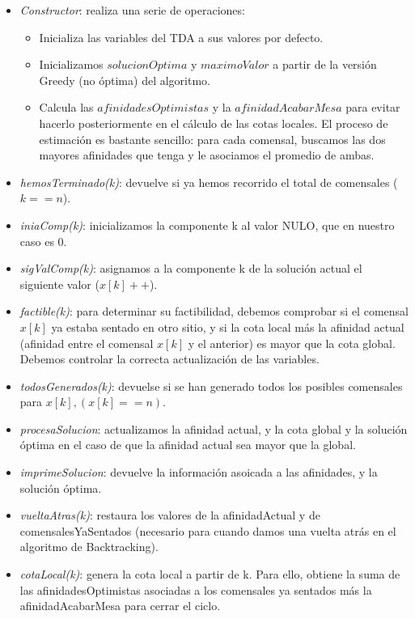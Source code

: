\documentclass{article}
\begin{document}
\begin{itemize}
\begin{itemize}
			\item \textit {Constructor}: realiza una serie de operaciones:
			\begin{itemize}
				\item Inicializa las variables del TDA a sus valores por defecto.
				\item Inicializamos $solucionOptima$ y $maximoValor$ a partir de la versión Greedy (no óptima) del algoritmo.
				\item Calcula las $afinidadesOptimistas$ y la $afinidadAcabarMesa$ para evitar hacerlo posteriormente en el cálculo de las cotas locales. El proceso de estimación es bastante sencillo: para cada comensal, buscamos las dos mayores afinidades que tenga y le asociamos el promedio de ambas.
			\end{itemize}
			\item \textit {hemosTerminado(k)}: devuelve si ya hemos recorrido el total de comensales ($k==n$).
			\item \textit {iniaComp(k)}: inicializamos la componente k al valor NULO, que en nuestro caso es 0.
			\item \textit{sigValComp(k)}: asignamos a la componente k de la solución actual el siguiente valor ($x[k]++$).
			\item \textit{factible(k)}: para determinar su factibilidad, debemos comprobar si el comensal $x[k]$ ya estaba sentado en otro sitio, y si la cota local más la afinidad actual (afinidad entre el comensal $x[k]$ y el anterior) es mayor que la cota global. Debemos controlar la correcta actualización de las variables. 
			\item \textit{todosGenerados(k)}: devuelse si se han generado todos los posibles comensales para $x[k], (x[k]==n)$. 
			\item \textit{procesaSolucion}: actualizamos la afinidad actual, y la cota global y la solución óptima en el caso de que la afinidad actual sea mayor que la global.
			\item \textit{imprimeSolucion}: devuelve la información asoicada a las afinidades, y la solución óptima. 
			\item \textit{vueltaAtras(k)}: restaura los valores de la afinidadActual y de comensalesYaSentados (necesario para cuando damos una vuelta atrás en el algoritmo de Backtracking).
			\item \textit{cotaLocal(k)}: genera la cota local a partir de k. Para ello, obtiene la suma de las afinidadesOptimistas asociadas a los comensales ya sentados más la afinidadAcabarMesa para cerrar el ciclo.
		\end{itemize}
	\end{itemize}
\end{document}

